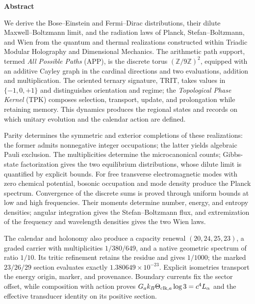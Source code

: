 {}
\begin{center}\bfseries Abstract\end{center}
\begingroup
\fontsize{9.5}{10.7}\selectfont
\setlength{\parskip}{1.5pt plus .5pt minus .5pt}
\noindent
We derive the Bose--Einstein and Fermi--Dirac distributions, their dilute
Maxwell--Boltzmann limit, and the radiation laws of Planck,
Stefan--Boltzmann, and Wien from the quantum and thermal realizations
constructed within Triadic Modular Holography and Dimensional Mechanics.
The arithmetic path support, termed \emph{All Possible Paths} (APP),
is the discrete torus \((\mathbb Z/9\mathbb Z)^2\), equipped with an
additive Cayley graph in the cardinal directions and two evaluations,
addition and multiplication. The oriented ternary signature, TRIT, takes
values in \(\{-1,0,+1\}\) and distinguishes orientation and regime;
the \emph{Topological Phase Kernel} (TPK) composes selection, transport,
update, and prolongation while retaining memory. This dynamics produces
the regional states and records on which unitary evolution and the
calendar action are defined.

Parity determines the symmetric and exterior completions of these
realizations: the former admits nonnegative integer occupations; the
latter yields algebraic Pauli exclusion. The multiplicities determine the microcanonical counts;
Gibbs-state factorization gives the two equilibrium distributions,
whose dilute limit is quantified by explicit bounds. For free
transverse electromagnetic modes with zero chemical potential, bosonic
occupation and mode density produce the Planck spectrum. Convergence of
the discrete sums is proved through uniform bounds at low and high
frequencies. Their moments determine number, energy, and entropy
densities; angular integration gives the Stefan--Boltzmann flux, and
extremization of the frequency and wavelength densities gives the two
Wien laws.

The calendar and holonomy also produce a capacity renewal
$(20,24,25,23)$, a graded carrier with multiplicities $1/380/649$, and a
native geometric spectrum of ratio $1/10$. Its tritic refinement retains the
residue and gives $1/1000$; the marked $23/26/29$ section evaluates exactly
$1.380649\times10^{-23}$. Explicit isometries transport the energy origin,
marker, and provenance. Boundary currents fix the sector offset, while
composition with action proves
$G_a k_B\Theta_{{\rm clk},a}\log3=c^4L_\alpha$ and the effective transducer
identity on its positive section.


